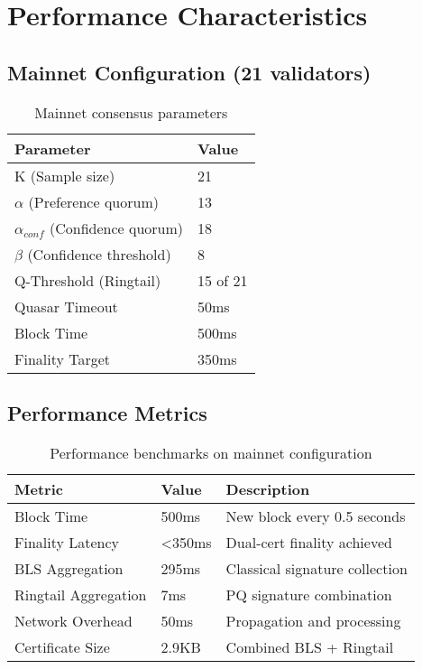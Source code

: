 \documentclass[11pt]{article}
\begin{document}
\section{Performance Characteristics}

\subsection{Mainnet Configuration (21 validators)}

\begin{table}[h]
\centering
\begin{tabular}{@{}ll@{}}
\toprule
\textbf{Parameter} & \textbf{Value} \\
\midrule
K (Sample size) & 21 \\
$\alpha$ (Preference quorum) & 13 \\
$\alpha_{conf}$ (Confidence quorum) & 18 \\
$\beta$ (Confidence threshold) & 8 \\
Q-Threshold (Ringtail) & 15 of 21 \\
Quasar Timeout & 50ms \\
Block Time & 500ms \\
Finality Target & 350ms \\
\bottomrule
\end{tabular}
\caption{Mainnet consensus parameters}
\label{tab:mainnet-params}
\end{table}

\subsection{Performance Metrics}

\begin{table}[h]
\centering
\begin{tabular}{@{}lll@{}}
\toprule
\textbf{Metric} & \textbf{Value} & \textbf{Description} \\
\midrule
Block Time & 500ms & New block every 0.5 seconds \\
Finality Latency & <350ms & Dual-cert finality achieved \\
BLS Aggregation & 295ms & Classical signature collection \\
Ringtail Aggregation & 7ms & PQ signature combination \\
Network Overhead & 50ms & Propagation and processing \\
Certificate Size & 2.9KB & Combined BLS + Ringtail \\
\bottomrule
\end{tabular}
\caption{Performance benchmarks on mainnet configuration}
\label{tab:performance}
\end{table}
\end{document}
